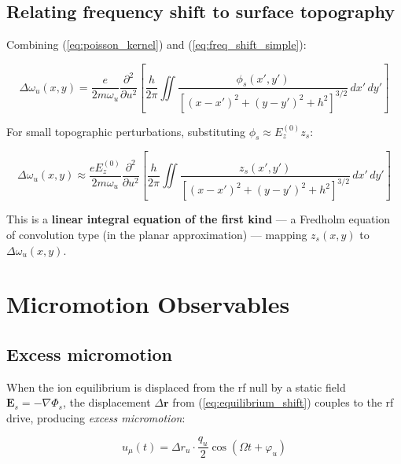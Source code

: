 \documentclass[11pt,a4paper]{article}
\begin{document}
\subsection{Relating frequency shift to surface topography}

Combining (\ref{eq:poisson_kernel}) and (\ref{eq:freq_shift_simple}):

\begin{equation}
\Delta\omega_u(x,y) = \frac{e}{2m\omega_u}
    \frac{\partial^2}{\partial u^2}\left[
        \frac{h}{2\pi}\iint
        \frac{\phi_s(x',y')}{[(x-x')^2 + (y-y')^2 + h^2]^{3/2}}\,dx'\,dy'
    \right]
\label{eq:forward_map}
\end{equation}

For small topographic perturbations, substituting $\phi_s \approx E_z^{(0)} z_s$:

\begin{equation}
\Delta\omega_u(x,y) \approx \frac{e E_z^{(0)}}{2m\omega_u}
    \frac{\partial^2}{\partial u^2}\left[
        \frac{h}{2\pi}\iint
        \frac{z_s(x',y')}{[(x-x')^2 + (y-y')^2 + h^2]^{3/2}}\,dx'\,dy'
    \right]
\label{eq:forward_map_topo}
\end{equation}

This is a \textbf{linear integral equation of the first kind} — a Fredholm equation
of convolution type (in the planar approximation) — mapping $z_s(x,y)$ to
$\Delta\omega_u(x,y)$.

\section{Micromotion Observables}

\subsection{Excess micromotion}

When the ion equilibrium is displaced from the rf null by a static field
$\mathbf{E}_s = -\nabla\Phi_s$, the displacement $\Delta\mathbf{r}$ from
(\ref{eq:equilibrium_shift}) couples to the rf drive, producing
\emph{excess micromotion}:

\begin{equation}
u_\mu(t) = \Delta r_u \cdot \frac{q_u}{2}\cos(\Omega t + \varphi_u)
\label{eq:excess_micromotion}
\end{equation}
\end{document}
